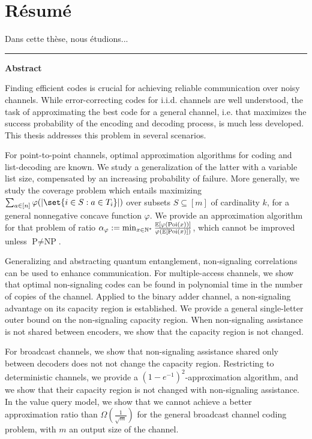 \chapter*{Résumé}

\begin{otherlanguage}{french}
  Dans cette thèse, nous étudions...
\end{otherlanguage}
\clearpage

\flushright
\bigskip
\hrule \bigskip \bigskip
{\Huge \textbf{\textsf{Abstract}}}
\flushleftright
{}
\vspace{1.5cm}

Finding efficient codes is crucial for achieving reliable communication over noisy channels. While error-correcting codes for i.i.d. channels are well understood, the task of approximating the best code for a general channel, i.e. that maximizes the success probability of the encoding and decoding process, is much less developed. This thesis addresses this problem in several scenarios.

For point-to-point channels, optimal approximation algorithms for coding and list-decoding are known. We study a generalization of the latter with a variable list size, compensated by an increasing probability of failure. More generally, we study the coverage problem which entails maximizing $\sum_{a \in [n]}  \varphi(\abs{\set{i \in S : a \in T_i}})$ over subsets $S \subseteq [m]$ of cardinality $k$, for a general nonnegative concave function $\varphi$. We provide an approximation algorithm for that problem of ratio $\alpha_{\varphi} := \min_{x \in \mathbb{N}^*} \frac{\mathbb{E}[\varphi(\operatorname{\text{Poi}}(x))]}{\varphi(\mathbb{E}[\operatorname{\text{Poi}}(x)])}$, which cannot be improved unless $\textrm{P}\not=\textrm{NP}$.

Generalizing and abstracting quantum entanglement, non-signaling correlations can be used to enhance communication. For multiple-access channels, we show that optimal non-signaling codes can be found in polynomial time in the number of copies of the channel. Applied to the binary adder channel, a non-signaling advantage on its capacity region is established. We provide a general single-letter outer bound on the non-signaling capacity region. When non-signaling assistance is not shared between encoders, we show that the capacity region is not changed.

For broadcast channels, we show that non-signaling assistance shared only between decoders does not not change the capacity region. Restricting to deterministic channels, we provide a $(1-e^{-1})^2$-approximation algorithm, and we show that their capacity region is not changed with non-signaling assistance. In the value query model, we show that we cannot achieve a better approximation ratio than $\Omega\left(\frac{1}{\sqrt{m}}\right)$ for the general broadcast channel coding problem, with $m$ an output size of the channel.


